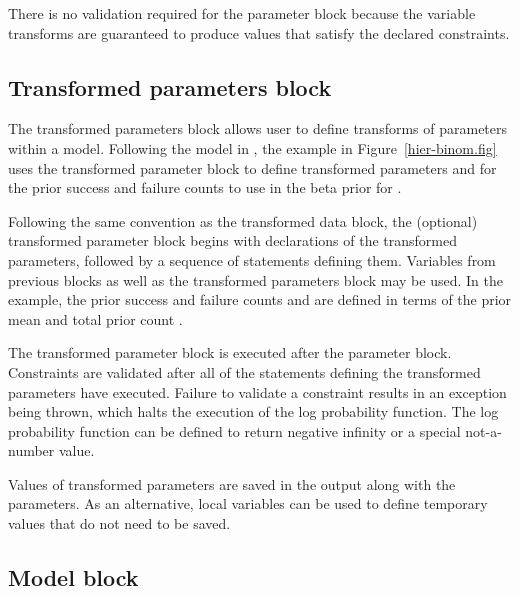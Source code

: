 \documentclass[article]{jss}
\begin{document}
There is no validation required for the parameter block because the
variable transforms are guaranteed to produce values that satisfy the
declared constraints.


\subsection{Transformed parameters block}

The transformed parameters block allows user to define transforms of
parameters within a model.  Following the model in
\citep{GelmanEtAl:2013}, the example in Figure~\ref{hier-binom.fig}
uses the transformed parameter block to define transformed parameters
 and  for the prior success and failure counts
to use in the beta prior for .  

Following the same convention as the transformed data block, the
(optional) transformed parameter block begins with declarations of the
transformed parameters, followed by a sequence of statements defining
them.  Variables from previous blocks as well as the transformed
parameters block may be used.  In the example, the prior success and
failure counts  and  are defined in terms of
the prior mean  and total prior count .

The transformed parameter block is executed after the parameter
block.  Constraints are validated after all of the statements defining the
transformed parameters have executed.  Failure to validate a
constraint results in an exception being thrown, which halts the
execution of the log probability function.  The log probability
function can be defined to return negative infinity or a special
not-a-number value. 

Values of transformed parameters are saved in the output along
with the parameters.  As an alternative, local variables can be used
to define temporary values that do not need to be saved.  

\subsection{Model block}
\end{document}
